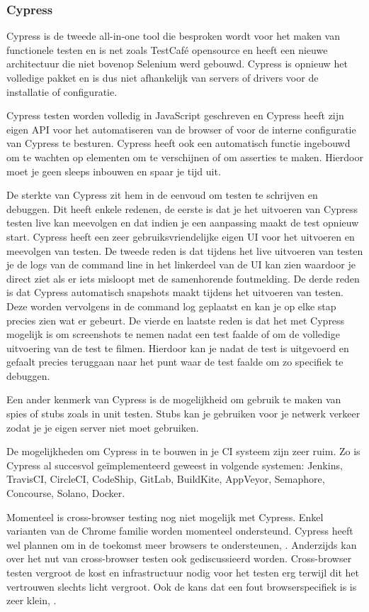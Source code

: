 \subsubsection{Cypress}
Cypress is de tweede all-in-one tool die besproken wordt voor het maken van functionele testen en is net zoals TestCafé opensource en heeft een nieuwe architectuur die niet bovenop Selenium werd gebouwd. Cypress is opnieuw het volledige pakket en is dus niet afhankelijk van servers of drivers voor de installatie of configuratie.

Cypress testen worden volledig in JavaScript geschreven en Cypress heeft zijn eigen API voor het automatiseren van de browser of voor de interne configuratie van Cypress te besturen. Cypress heeft ook een automatisch functie ingebouwd om te wachten op elementen om te verschijnen of om asserties te maken. Hierdoor moet je geen sleeps inbouwen en spaar je tijd uit.

De sterkte van Cypress zit hem in de eenvoud om testen te schrijven en debuggen. Dit heeft enkele redenen, de eerste is dat je het uitvoeren van Cypress testen live kan meevolgen en dat indien je een aanpassing maakt de test opnieuw start. Cypress heeft een zeer gebruiksvriendelijke eigen UI voor het uitvoeren en meevolgen van testen. De tweede reden is dat tijdens het live uitvoeren van testen je de logs van de command line in het linkerdeel van de UI kan zien waardoor je direct ziet als er iets misloopt met de samenhorende foutmelding. De derde reden is dat Cypress automatisch snapshots maakt tijdens het uitvoeren van testen. Deze worden vervolgens in de command log geplaatst en kan je op elke stap precies zien wat er gebeurt. De vierde en laatste reden is dat het met Cypress mogelijk is om screenshots te nemen nadat een test faalde of om de volledige uitvoering van de test te filmen. Hierdoor kan je nadat de test is uitgevoerd en gefaalt precies teruggaan naar het punt waar de test faalde om zo specifiek te debuggen.

Een ander kenmerk van Cypress is de mogelijkheid om gebruik te maken van spies of stubs zoals in unit testen. Stubs kan je gebruiken voor je netwerk verkeer zodat je je eigen server niet moet gebruiken.

De mogelijkheden om Cypress in te bouwen in je CI systeem zijn zeer ruim. Zo is Cypress al succesvol geïmplementeerd geweest in volgende systemen: Jenkins, TravisCI, CircleCI, CodeShip, GitLab, BuildKite, AppVeyor, Semaphore, Concourse, Solano, Docker.

Momenteel is cross-browser testing nog niet mogelijk met Cypress. Enkel varianten van de Chrome familie worden momenteel ondersteund. Cypress heeft wel plannen om in de toekomst meer browsers te ondersteunen, \textcite{Mann2017}. Anderzijds kan over het nut van cross-browser testen ook gediscussieerd worden. Cross-browser testen vergroot de kost en infrastructuur nodig voor het testen erg terwijl dit het vertrouwen slechts licht vergroot. Ook de kans dat een fout browserspecifiek is is zeer klein, \textcite{Mann2018}.

